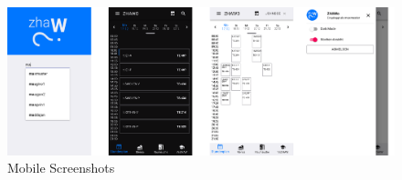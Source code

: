 \begin{markdown}
\bigskip

\begin{figure}[H]
  \includegraphics[width=16.5cm, center]{../../Mockups/screenshots.png}
  \caption{\textsf{Mobile Screenshots}}
\end{figure}

\end{markdown}
